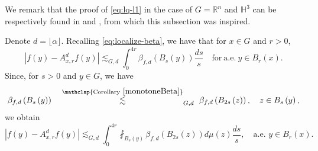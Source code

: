 \documentclass[11pt,reqno]{amsart}
\newcommand{\1}{\mathbf 1}
\begin{document}
We remark that the proof of \eqref{eq:lq-l1} in the case of $G=\mathbb{R}^n$ and $\mathbb{H}^3$ can be respectively found in \cite[Section 5]{dorronsoro1985characterization} and \cite[Section 6]{fassler2020dorronsoro}, from which this subsection was inspired.

Denote $d=\lfloor\alpha\rfloor$. Recalling \eqref{eq:localize-beta}, we have that for $x\in G$ and $r>0$,
\[
\left|f\left(y\right) - A^d_{x,r}f\left(y\right)\right| \lesssim_{G,d} \int_0^{4r} \beta_{f,d}\left(B_s\left(y\right)\right)  \frac{ds}{s}\quad \mathrm{for~a.e.~}y\in B_r\left(x\right).
\]
Since, for $s>0$ and $y\in G$, we have
\[
\beta_{f,d}\left(B_s\left(y\right)\right)\quad\stackrel{\mathclap{\mathrm{Corollary~}\ref{monotoneBeta}}}\lesssim_{G,d}~ \beta_{f,d}\left(B_{2s}\left(z\right)\right),\quad z\in B_s\left(y\right),
\]
we obtain
\begin{equation}\label{form9}
\left|f\left(y\right) - A^d_{x,r}f\left(y\right)\right| \lesssim_{G,d} \int_0^{4r} \fint_{B_s\left(y\right)} \beta_{f,d}\left(B_{2s}\left(z\right)\right)  d\mu\left(z\right)  \frac{ds}{s},\quad \mbox{a.e. }y\in B_r\left(x\right).
\end{equation}
\end{document}
